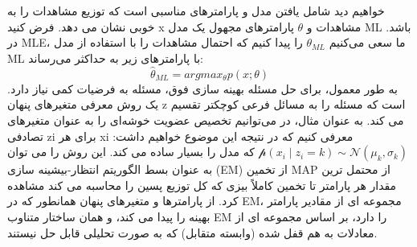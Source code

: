 \newpage
\huge
\raggedright \section{}
\large
\raggedright {}
\begin{flushright}
خواهیم دید   شامل یافتن مدل و پارامترهای مناسبی است که توزیع مشاهدات را به خوبی نشان می دهد. فرض کنید x مشاهدات و $ \theta $ پارامترهای مجهول یک مدل ML باشد. در MLE، ما سعی می‌کنیم $ \theta_{ML} $ را پیدا کنیم که احتمال مشاهدات را با استفاده از مدل ML با پارامترهای زیر به حداکثر می‌رساند:
\begin{equation}
\hat{\theta}_{ML} = argmax_\theta p(x;\theta)
\end{equation}
به طور معمول، برای حل مسئله بهینه سازی فوق، مسئله به فرضیات کمی نیاز دارد. یک روش معرفی متغیرهای پنهان z است  که مسئله را به مسائل فرعی کوچکتر تقسیم می کند. به عنوان مثال، در   می‌توانیم تخصیص عضویت خوشه‌ای را به عنوان متغیرهای تصادفی zi برای هر xi معرفی کنیم که در نتیجه این موضوع خواهیم داشت:
$ \mathcal p(x_i\mid z_i = k) \sim \mathcal N(\mu_k,\sigma_k) $
که مدل را بسیار ساده می کند.
این روش را می توان به عنوان بسط الگوریتم انتظار-بیشینه سازی (EM) از تخمین MAP از محتمل ترین مقدار هر پارامتر تا تخمین کاملاً بیزی که کل توزیع پسین را محاسبه می کند مشاهده کرد. از پارامترها و متغیرهای پنهان همانطور که در EM، مجموعه ای از مقادیر پارامتر بهینه را پیدا می کند، و همان ساختار متناوب EM را دارد، بر اساس مجموعه ای از معادلات به هم قفل شده (وابسته متقابل) که به صورت تحلیلی قابل حل نیستند.


\end{flushright}
